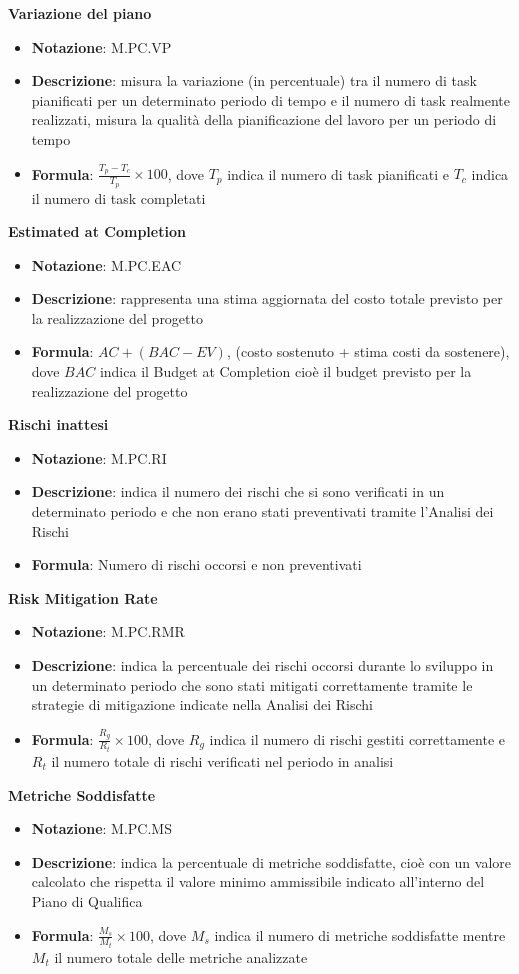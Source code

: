 \textbf{Variazione del piano}
\begin{itemize}
    \item \textbf{Notazione}: M.PC.VP
    \item \textbf{Descrizione}: misura la variazione (in percentuale) tra il numero di task pianificati per un determinato periodo di tempo e il numero di task realmente realizzati, misura la qualità della pianificazione del lavoro per un periodo di tempo
    \item \textbf{Formula}: $\frac{T_p - T_c}{T_p} \times 100$, dove $T_p$ indica il numero di task pianificati e $T_c$ indica il numero di task completati
\end{itemize}
\textbf{Estimated at Completion}
\begin{itemize}
    \item \textbf{Notazione}: M.PC.EAC
    \item \textbf{Descrizione}: rappresenta una stima aggiornata del costo totale previsto per la realizzazione del progetto
    \item \textbf{Formula}: $AC + (BAC - EV)$, (costo sostenuto + stima costi da sostenere), dove $BAC$ indica il Budget at Completion cioè il budget previsto per la realizzazione del progetto
\end{itemize}
\textbf{Rischi inattesi}
\begin{itemize}
    \item \textbf{Notazione}: M.PC.RI
    \item \textbf{Descrizione}: indica il numero dei rischi che si sono verificati in un determinato periodo e che non erano stati preventivati tramite l'Analisi dei Rischi
    \item \textbf{Formula}: Numero di rischi occorsi e non preventivati
\end{itemize}
\textbf{Risk Mitigation Rate}
\begin{itemize}
    \item \textbf{Notazione}: M.PC.RMR
    \item \textbf{Descrizione}: indica la percentuale dei rischi occorsi durante lo sviluppo in un determinato periodo che sono stati mitigati correttamente tramite le strategie di mitigazione indicate nella Analisi dei Rischi
    \item \textbf{Formula}: $\frac{R_g}{R_t} \times 100$, dove $R_g$ indica il numero di rischi gestiti correttamente e $R_t$ il numero totale di rischi verificati nel periodo in analisi
\end{itemize}
\textbf{Metriche Soddisfatte}
\begin{itemize}
    \item \textbf{Notazione}: M.PC.MS
    \item \textbf{Descrizione}: indica la percentuale di metriche soddisfatte, cioè con un valore calcolato che rispetta il valore minimo ammissibile indicato all'interno del Piano di Qualifica
    \item \textbf{Formula}: $\frac{M_s}{M_t} \times 100$, dove $M_s$ indica il numero di metriche soddisfatte mentre $M_t$ il numero totale delle metriche analizzate 
\end{itemize}
